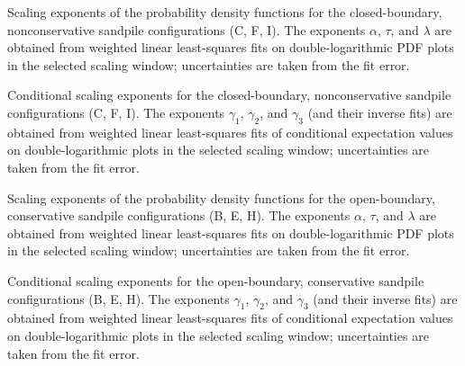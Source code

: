 \begin{table}[!ht]
  \centering
  
  \caption{Scaling exponents of the probability density functions for the closed-boundary, nonconservative sandpile configurations (C, F, I). The exponents $\alpha$, $\tau$, and $\lambda$ are obtained from weighted linear least-squares fits on double-logarithmic PDF plots in the selected scaling window; uncertainties are taken from the fit error.}
  \label{tab:scaling_exp_closed_nonconservative}
\end{table}

\begin{table}[!ht]
  \centering
  
  \caption{Conditional scaling exponents for the closed-boundary, nonconservative sandpile configurations (C, F, I). The exponents $\gamma_1$, $\gamma_2$, and $\gamma_3$ (and their inverse fits) are obtained from weighted linear least-squares fits of conditional expectation values on double-logarithmic plots in the selected scaling window; uncertainties are taken from the fit error.}
  \label{tab:scaling_exp_closed_nonconservative_gamma}
\end{table}

\begin{table}[!ht]
  \centering
  
  \caption{Scaling exponents of the probability density functions for the open-boundary, conservative sandpile configurations (B, E, H). The exponents $\alpha$, $\tau$, and $\lambda$ are obtained from weighted linear least-squares fits on double-logarithmic PDF plots in the selected scaling window; uncertainties are taken from the fit error.}
  \label{tab:scaling_exp_open_conservative}
\end{table}

\begin{table}[!ht]
  \centering
  
  \caption{Conditional scaling exponents for the open-boundary, conservative sandpile configurations (B, E, H). The exponents $\gamma_1$, $\gamma_2$, and $\gamma_3$ (and their inverse fits) are obtained from weighted linear least-squares fits of conditional expectation values on double-logarithmic plots in the selected scaling window; uncertainties are taken from the fit error.}
  \label{tab:scaling_exp_open_conservative_gamma}
\end{table}



